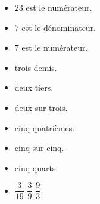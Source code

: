 \vfill{}
\begin{itemize}[label={},leftmargin=1cm,itemsep=0.15cm]
\item {} \quad $23$ est le numérateur.
\item {} \quad $7$ est le dénominateur.
\item {} \quad $7$ est le numérateur.
\end{itemize}

\vfill{}
\begin{itemize}[label={},leftmargin=1cm,itemsep=0.15cm]
\item {} \quad trois demis.
\item {} \quad deux tiers.
\item {} \quad deux sur trois.
\end{itemize}

\vfill{}
\begin{itemize}[label={},leftmargin=1cm,itemsep=0.15cm]
\item {} \quad cinq quatrièmes.
\item {} \quad cinq sur cinq.
\item {} \quad cinq quarts.
\end{itemize}

\vfill{}
\begin{itemize}[label={},leftmargin=1cm,itemsep=0.15cm]
\item {} \quad $\dfrac{3}{19}$ \qquad {} \quad $\dfrac{3}{9}$ \qquad {} \quad $\dfrac{9}{3}$
\end{itemize}

\newpage
{}
\begin{center}
\end{center}

